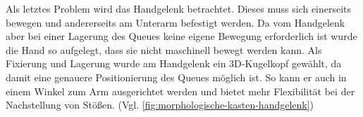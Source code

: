 	Als letztes Problem wird das Handgelenk betrachtet. Dieses muss sich einerseits bewegen und andererseits am Unterarm befestigt werden. Da vom Handgelenk aber bei einer Lagerung des Queues keine eigene Bewegung erforderlich ist wurde die Hand so aufgelegt, dass sie nicht maschinell bewegt werden kann. Als Fixierung und Lagerung wurde am Handgelenk ein 3D-Kugelkopf gewählt, da damit eine genauere Positionierung des Queues möglich ist. So kann er auch in einem Winkel zum Arm ausgerichtet werden und bietet mehr Flexibilität bei der Nachstellung von Stößen. (Vgl. \cref{fig:morphologische-kasten-handgelenk})